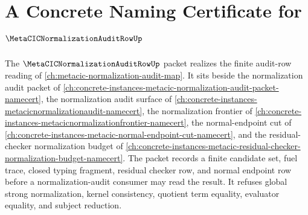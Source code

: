 \chapter{A Concrete Naming Certificate for $\MetaCICNormalizationAuditRowUp$}
\label{ch:concrete-instances-metacic-normalization-audit-row-namecert}

The $\MetaCICNormalizationAuditRowUp$ packet realizes the finite audit-row reading of \autoref{ch:metacic-normalization-audit-map}. It sits beside the normalization audit packet of \autoref{ch:concrete-instances-metacic-normalization-audit-packet-namecert}, the normalization audit surface of \autoref{ch:concrete-instances-metacicnormalizationaudit-namecert}, the normalization frontier of \autoref{ch:concrete-instances-metacicnormalizationfrontier-namecert}, the normal-endpoint cut of \autoref{ch:concrete-instances-metacic-normal-endpoint-cut-namecert}, and the residual-checker normalization budget of \autoref{ch:concrete-instances-metacic-residual-checker-normalization-budget-namecert}. The packet records a finite candidate set, fuel trace, closed typing fragment, residual checker row, and normal endpoint row before a normalization-audit consumer may read the result. It refuses global strong normalization, kernel consistency, quotient term equality, evaluator equality, and subject reduction.

